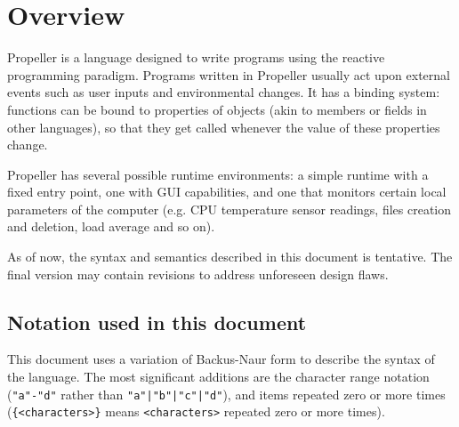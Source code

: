 \section{Overview}

Propeller is a language designed to write programs using the reactive programming paradigm. Programs
written in Propeller usually act upon external events such as user inputs and environmental changes.
It has a binding system: functions can be bound to properties of objects (akin to members or fields
in other languages), so that they get called whenever the value of these properties change.

Propeller has several possible runtime environments: a simple runtime with a fixed entry point, one
with GUI capabilities, and one that monitors certain local parameters of the computer (e.g. CPU
temperature sensor readings, files creation and deletion, load average and so on).

As of now, the syntax and semantics described in this document is tentative. The final version may
contain revisions to address unforeseen design flaws.

\subsection{Notation used in this document}

This document uses a variation of Backus-Naur form to describe the syntax of the language. The most
significant additions are the character range notation (\verb|"a"-"d"| rather than
\verb:"a"|"b"|"c"|"d":), and items repeated zero or more times (\verb|{<characters>}| means
\verb|<characters>| repeated zero or more times).

